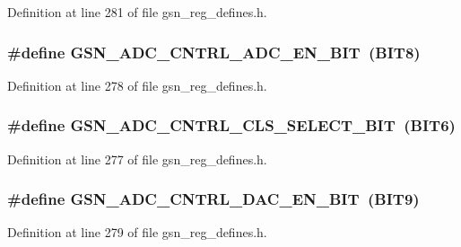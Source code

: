 Definition at line 281 of file gsn\_\-reg\_\-defines.h.

\hypertarget{a00546_a2a7aca33a7937b93d109725a499b9a25}{
\subsubsection[{GSN\_\-ADC\_\-CNTRL\_\-ADC\_\-EN\_\-BIT}]{\setlength{\rightskip}{0pt plus 5cm}\#define GSN\_\-ADC\_\-CNTRL\_\-ADC\_\-EN\_\-BIT~(BIT8)}}
\label{a00546_a2a7aca33a7937b93d109725a499b9a25}


Definition at line 278 of file gsn\_\-reg\_\-defines.h.

\hypertarget{a00546_a3882fadc88f86eb405a4fe78f0d26be5}{
\subsubsection[{GSN\_\-ADC\_\-CNTRL\_\-CLS\_\-SELECT\_\-BIT}]{\setlength{\rightskip}{0pt plus 5cm}\#define GSN\_\-ADC\_\-CNTRL\_\-CLS\_\-SELECT\_\-BIT~(BIT6)}}
\label{a00546_a3882fadc88f86eb405a4fe78f0d26be5}


Definition at line 277 of file gsn\_\-reg\_\-defines.h.

\hypertarget{a00546_a662469675c433fbde7feee3956b079a7}{
\subsubsection[{GSN\_\-ADC\_\-CNTRL\_\-DAC\_\-EN\_\-BIT}]{\setlength{\rightskip}{0pt plus 5cm}\#define GSN\_\-ADC\_\-CNTRL\_\-DAC\_\-EN\_\-BIT~(BIT9)}}
\label{a00546_a662469675c433fbde7feee3956b079a7}


Definition at line 279 of file gsn\_\-reg\_\-defines.h.

